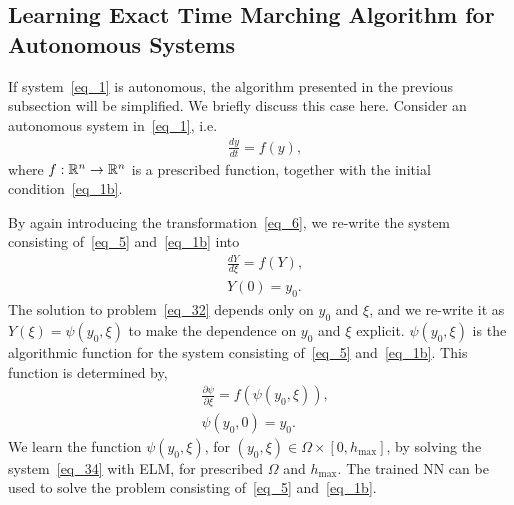 


\subsection{Learning Exact Time Marching Algorithm for Autonomous Systems}

If system~\eqref{eq_1} is autonomous, the algorithm presented in
the previous subsection will be simplified.
We briefly discuss this case here.
Consider an autonomous system in~\eqref{eq_1}, i.e.
\begin{align}
  & \frac{dy}{dt} = f(y), \label{eq_5}
\end{align}
where $f: \mathbb{R}^n\rightarrow \mathbb{R}^n$ is a prescribed function,
together with the initial condition~\eqref{eq_1b}.


By again introducing the transformation~\eqref{eq_6}, we re-write the
system consisting of~\eqref{eq_5} and~\eqref{eq_1b} into
\begin{subequations}\label{eq_32}
  \begin{align}
    & \frac{dY}{d\xi} = f(Y), \\
    & Y(0) = y_0.
  \end{align}
\end{subequations}
The solution to problem~\eqref{eq_32} depends only on $y_0$ and
$\xi$, and we re-write it as
$  %
  Y(\xi) = \psi(y_0,\xi)
$  %
to make the dependence on $y_0$ and $\xi$ explicit.
$\psi(y_0,\xi)$ is the algorithmic function for the system consisting of~\eqref{eq_5}
and~\eqref{eq_1b}. This function is determined by,
\begin{subequations}\label{eq_34}
  \begin{align}
    &
    \frac{\partial\psi}{\partial\xi} = f(\psi(y_0,\xi)),
    \label{eq_34a} \\
    & \psi(y_0,0) = y_0. \label{eq_34b}
  \end{align}
\end{subequations}
We learn the function $\psi(y_0,\xi)$, for $(y_0,\xi)\in\Omega\times[0,h_{\max}]$,
by solving the system~\eqref{eq_34} with ELM,
for prescribed $\Omega$ and $h_{\max}$.
The trained NN can be used to solve the problem consisting of~\eqref{eq_5}
and~\eqref{eq_1b}.



